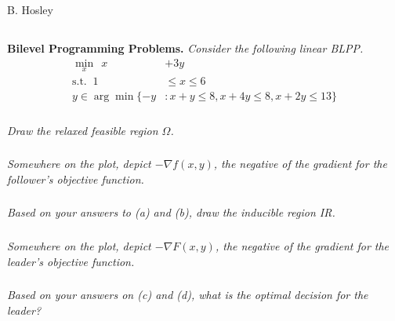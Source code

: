\documentclass[12pt]{amsart}
\begin{document}
\raggedbottom

\hspace{\fill} {\large B. Hosley}
\bigskip


\setcounter{subsection}{0}
\subsection{}
\textbf{Bilevel Programming Problems.} 
\textit{Consider the following linear BLPP.}
\begin{align*}
	\min_x\	\ x &+ 3y \\
	\text{s.t. }\	1 &\leq x \leq 6 \\
	y \in \arg\min \{ -y &: x + y \leq 8, x + 4y \leq 8, x + 2y \leq 13 \}
\end{align*}

%
%

\subsubsection{}
\textit{Draw the relaxed feasible region $\Omega$.}

\subsubsection{}
\textit{Somewhere on the plot, depict $-\nabla f(x,y)$, the negative of the gradient for the follower’s objective function.}

\subsubsection{}
\textit{Based on your answers to (a) and (b), draw the inducible region IR.}

\subsubsection{}
\textit{Somewhere on the plot, depict $-\nabla F(x,y)$, the negative of the gradient for the leader’s objective function.}

\subsubsection{}
\textit{Based on your answers on (c) and (d), what is the optimal decision for the leader?}
\end{document}
